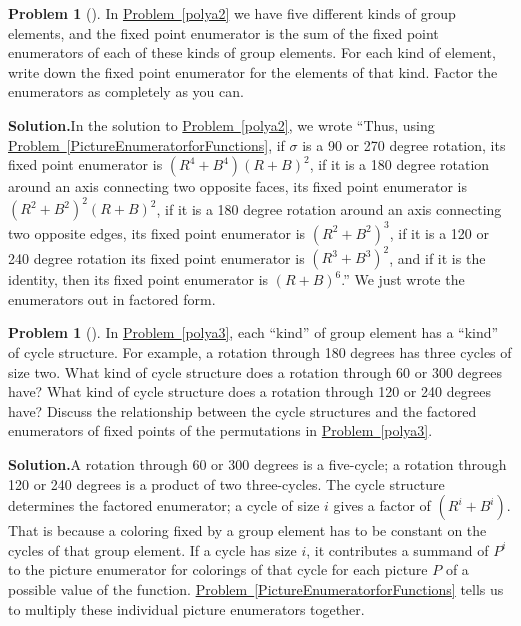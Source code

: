 \documentclass[10pt,]{book}
\theoremstyle{plain}
\theoremstyle{definition}
\newtheorem{activity}[project]{Problem}
\theoremstyle{definition}
\numberwithin{equation}{chapter}
\begin{document}
\begin{activity}[]\label{polya4}
In \hyperref[polya2]{Problem~\ref{polya2}} we have five different kinds of group elements, and the fixed point enumerator is the sum of the fixed point enumerators of each of these kinds of group elements. For each kind of element, write down the fixed point enumerator for the elements of that kind. Factor the enumerators as completely as you can.%
\par\medskip\noindent%
\textbf{Solution.}\quad In the solution to \hyperref[polya2]{Problem~\ref{polya2}}, we wrote ``Thus, using \hyperref[PictureEnumeratorforFunctions]{Problem~\ref{PictureEnumeratorforFunctions}}, if \(\sigma\) is a 90 or 270 degree rotation, its fixed point enumerator is \((R^4+B^4)(R+B)^2\), if it is a 180 degree rotation around an axis connecting two opposite faces, its fixed point enumerator is \((R^2+B^2)^2(R+B)^2\), if it is a 180 degree rotation around an axis connecting two opposite edges, its fixed point enumerator is \((R^2+B^2)^3\), if it is a 120 or 240 degree rotation its fixed point enumerator is \((R^3+B^3)^2\), and if it is the identity, then its fixed point enumerator is \((R+B)^6\).'' We just wrote the enumerators out in factored form.%
\end{activity}
\begin{activity}[]\label{polya3_5}
In \hyperref[polya3]{Problem~\ref{polya3}}, each ``kind'' of group element has a ``kind'' of cycle structure. For example, a rotation through 180 degrees has three cycles of size two. What kind of cycle structure does a rotation through 60 or 300 degrees have? What kind of cycle structure does a rotation through 120 or 240 degrees have? Discuss the relationship between the cycle structures and the factored enumerators of fixed points of the permutations in \hyperref[polya3]{Problem~\ref{polya3}}.%
\par\medskip\noindent%
\textbf{Solution.}\quad A rotation through 60 or 300 degrees is a five-cycle; a rotation through 120 or 240 degrees is a product of two three-cycles. The cycle structure determines the factored enumerator; a cycle of size \(i\) gives a factor of \((R^i+B^i)\). That is because a coloring fixed by a group element has to be constant on the cycles of that group element. If a cycle has size \(i\), it contributes a summand of \(P^i\) to the picture enumerator for colorings of that cycle for each picture \(P\) of a possible value of the function. \hyperref[PictureEnumeratorforFunctions]{Problem~\ref{PictureEnumeratorforFunctions}} tells us to multiply these individual picture enumerators together.%
\end{activity}
\end{document}
